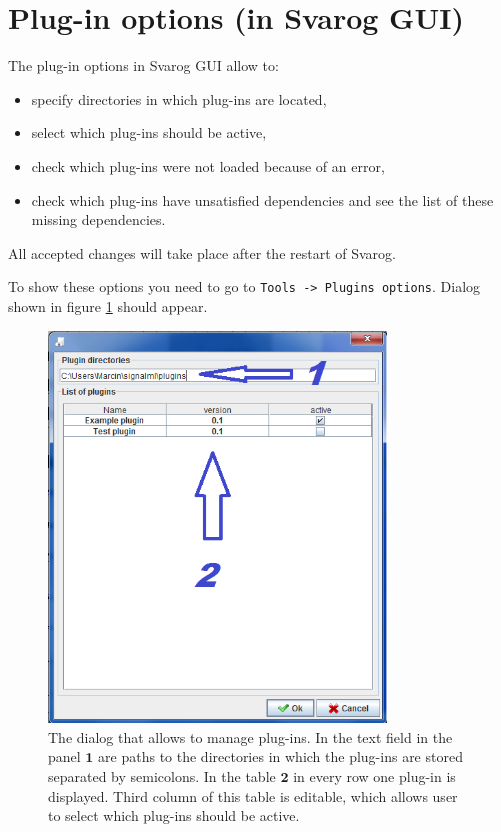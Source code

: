 \documentclass{article}
\begin{document}
\section{Plug-in options (in Svarog GUI)}

The plug-in options in Svarog GUI allow to: 
\begin{itemize}
	\item specify directories in which plug-ins are located,
	\item select which plug-ins should be active,
	\item check which plug-ins were not loaded because of an error,
	\item check which plug-ins have unsatisfied dependencies and see the list of these missing dependencies.
\end{itemize}
All accepted changes will take place after the restart of Svarog.

To show these options you need to go to \verb=Tools -> Plugins options=.
Dialog shown in figure \ref{plugin_options} should appear.

\begin{figure}
\includegraphics[width=0.8\textwidth]{plugin_options.png}
\caption{The dialog that allows to manage plug-ins.
In the text field in the panel $\mathbf{1}$ are paths to the directories in which the plug-ins are stored separated by semicolons.\newline
In the table $\mathbf{2}$ in every row one plug-in is displayed.
Third column of this table is editable, which allows user to select which plug-ins should be active.
}
\label{plugin_options}
\end{figure}
\end{document}
